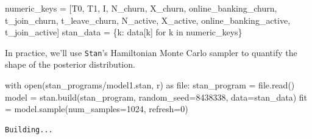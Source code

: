 \documentclass[
  letterpaper,
  DIV=11,
  numbers=noendperiod]{scrartcl}
\newenvironment{Shaded}{\begin{snugshade}}{\end{snugshade}}
\newcommand{\BuiltInTok}[1]{\textcolor[rgb]{0.00,0.23,0.31}{#1}}
\newcommand{\ControlFlowTok}[1]{\textcolor[rgb]{0.00,0.23,0.31}{#1}}
\newcommand{\DecValTok}[1]{\textcolor[rgb]{0.68,0.00,0.00}{#1}}
\newcommand{\ImportTok}[1]{\textcolor[rgb]{0.00,0.46,0.62}{#1}}
\newcommand{\KeywordTok}[1]{\textcolor[rgb]{0.00,0.23,0.31}{#1}}
\newcommand{\NormalTok}[1]{\textcolor[rgb]{0.00,0.23,0.31}{#1}}
\newcommand{\OperatorTok}[1]{\textcolor[rgb]{0.37,0.37,0.37}{#1}}
\newcommand{\StringTok}[1]{\textcolor[rgb]{0.13,0.47,0.30}{#1}}
\begin{document}
\begin{Shaded}
\begin{Highlighting}[]
\NormalTok{numeric\_keys }\OperatorTok{=}\NormalTok{ [}\StringTok{\textquotesingle{}T0\textquotesingle{}}\NormalTok{, }\StringTok{\textquotesingle{}T1\textquotesingle{}}\NormalTok{, }\StringTok{\textquotesingle{}I\textquotesingle{}}\NormalTok{, }\StringTok{\textquotesingle{}N\_churn\textquotesingle{}}\NormalTok{, }\StringTok{\textquotesingle{}X\_churn\textquotesingle{}}\NormalTok{,}
                \StringTok{\textquotesingle{}online\_banking\_churn\textquotesingle{}}\NormalTok{, }\StringTok{\textquotesingle{}t\_join\_churn\textquotesingle{}}\NormalTok{,}
                \StringTok{\textquotesingle{}t\_leave\_churn\textquotesingle{}}\NormalTok{, }\StringTok{\textquotesingle{}N\_active\textquotesingle{}}\NormalTok{, }\StringTok{\textquotesingle{}X\_active\textquotesingle{}}\NormalTok{,}
                \StringTok{\textquotesingle{}online\_banking\_active\textquotesingle{}}\NormalTok{, }\StringTok{\textquotesingle{}t\_join\_active\textquotesingle{}}\NormalTok{]}
\NormalTok{stan\_data }\OperatorTok{=}\NormalTok{ \{k: data[k] }\ControlFlowTok{for}\NormalTok{ k }\KeywordTok{in}\NormalTok{ numeric\_keys\}}
\end{Highlighting}
\end{Shaded}

In practice, we'll use \texttt{Stan}'s Hamiltonian Monte Carlo sampler
to quantify the shape of the posterior distribution.

\begin{Shaded}
\begin{Highlighting}[]
\ControlFlowTok{with} \BuiltInTok{open}\NormalTok{(}\StringTok{\textquotesingle{}stan\_programs/model1.stan\textquotesingle{}}\NormalTok{, }\StringTok{\textquotesingle{}r\textquotesingle{}}\NormalTok{) }\ImportTok{as} \BuiltInTok{file}\NormalTok{:}
\NormalTok{  stan\_program }\OperatorTok{=} \BuiltInTok{file}\NormalTok{.read()}
\NormalTok{model }\OperatorTok{=}\NormalTok{ stan.build(stan\_program,}
\NormalTok{                   random\_seed}\OperatorTok{=}\DecValTok{8438338}\NormalTok{,}
\NormalTok{                   data}\OperatorTok{=}\NormalTok{stan\_data)}
\NormalTok{fit }\OperatorTok{=}\NormalTok{ model.sample(num\_samples}\OperatorTok{=}\DecValTok{1024}\NormalTok{, refresh}\OperatorTok{=}\DecValTok{0}\NormalTok{)}
\end{Highlighting}
\end{Shaded}

\begin{verbatim}
Building...
\end{verbatim}
\end{document}
